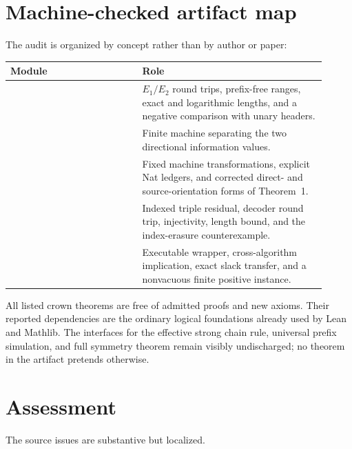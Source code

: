 \documentclass[11pt]{article}
\newcommand{\Eone}{E_1}
\newcommand{\Etwo}{E_2}
\begin{document}
\section{Machine-checked artifact map}

The audit is organized by concept rather than by author or paper:

\begin{center}
\begin{tabular}{L{0.38\linewidth}L{0.53\linewidth}}
\toprule
Module & Role \\
\midrule
{} &
$\Eone/\Etwo$ round trips, prefix-free ranges, exact and logarithmic lengths,
and a negative comparison with unary headers. \\
 &
Finite machine separating the two directional information values. \\
 &
Fixed machine transformations, explicit Nat ledgers, and corrected direct-
and source-orientation forms of Theorem~1. \\
 &
Indexed triple residual, decoder round trip, injectivity, length bound, and
the index-erasure counterexample. \\
 &
Executable wrapper, cross-algorithm implication, exact slack transfer, and a
nonvacuous finite positive instance. \\
\bottomrule
\end{tabular}
\end{center}

All listed crown theorems are free of admitted proofs and new axioms.  Their
reported dependencies are the ordinary logical foundations already used by
Lean and Mathlib.  The interfaces for the effective strong chain rule,
universal prefix simulation, and full symmetry theorem remain visibly
undischarged; no theorem in the artifact pretends otherwise.

\section{Assessment}

The source issues are substantive but localized.
\end{document}
